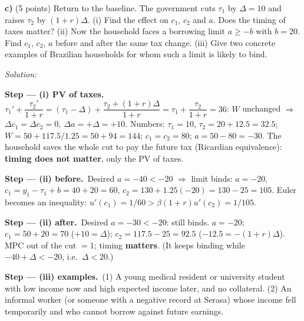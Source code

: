 \documentclass[11pt,a4paper]{article}
\newif\ifsolucoes
\newcommand{\answerheight}{5.2cm}
\newcommand{\answerspace}{\ifsolucoes\else\par\textit{Solution:}\vspace{\answerheight}\par\fi}
\newcommand{\step}[2]{\par\smallskip\noindent\textbf{Step --- #1.}~#2}
\newcommand{\res}[1]{\boxed{#1}}
\begin{document}
\textbf{c)} (5 points) Return to the baseline. The government cuts $\tau_1$ by $\Delta=10$ and raises
$\tau_2$ by $(1+r)\Delta$. (i) Find the effect on $c_1$, $c_2$ and $a$. Does the timing of taxes matter?
(ii) Now the household faces a borrowing limit $a\ge-b$ with $b=20$. Find $c_1$, $c_2$, $a$ before and
after the same tax change. (iii) Give two concrete examples of Brazilian households for whom such a
limit is likely to bind.
\answerspace
\begin{sol}
\step{(i) PV of taxes}{$\tau_1'+\dfrac{\tau_2'}{1+r}=(\tau_1-\Delta)+\dfrac{\tau_2+(1+r)\Delta}{1+r}=\tau_1+\dfrac{\tau_2}{1+r}=36$:
$W$ unchanged $\Rightarrow$ $\res{\Delta c_1=\Delta c_2=0,\ \Delta a=+\Delta=+10}$.
Numbers: $\tau_1=10$, $\tau_2=20+12.5=32.5$; $W=50+117.5/1.25=50+94=144$; $c_1=c_2=80$; $a=50-80=-30$.
The household saves the whole cut to pay the future tax (Ricardian equivalence): \textbf{timing does not
matter}, only the PV of taxes.}
\step{(ii) before}{Desired $a=-40<-20$ $\Rightarrow$ limit binds: $a=-20$, $c_1=y_1-\tau_1+b=40+20=\res{60}$,
$c_2=130+1.25(-20)=130-25=\res{105}$. Euler becomes an inequality: $u'(c_1)=1/60>\beta(1+r)u'(c_2)=1/105$.}
\step{(ii) after}{Desired $a=-30<-20$: still binds. $a=-20$; $c_1=50+20=\res{70}$ ($+10=\Delta$);
$c_2=117.5-25=\res{92.5}$ ($-12.5=-(1+r)\Delta$). MPC out of the cut $=1$; timing \textbf{matters}.
(It keeps binding while $-40+\Delta<-20$, i.e.\ $\Delta<20$.)}
\step{(iii) examples}{(1) A young medical resident or university student with low income now and high
expected income later, and no collateral. (2) An informal worker (or someone with a negative record at
Serasa) whose income fell temporarily and who cannot borrow against future earnings.}
\begin{center}
\end{center}
\end{sol}
\end{document}

